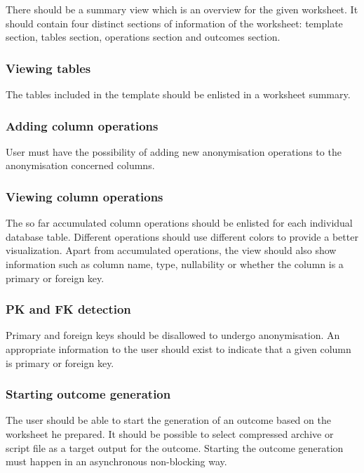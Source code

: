 \documentclass[a4paper,twoside,12pt]{book}
\begin{document}
There should be a summary view which is an overview for the given worksheet. It should contain four distinct sections of information of the worksheet: template section, tables section, operations section and outcomes section.

\subsubsection{Viewing tables}

The tables included in the template should be enlisted in a worksheet summary.

\subsubsection{Adding column operations}

User must have the possibility of adding new anonymisation operations to the anonymisation concerned columns.

\subsubsection{Viewing column operations}

The so far accumulated column operations should be enlisted for each individual database table. Different operations should use different colors to provide a better visualization. Apart from accumulated operations, the view should also show information such as column name, type, nullability or whether the column is a primary or foreign key.

\subsubsection{PK and FK detection}

Primary and foreign keys should be disallowed to undergo anonymisation. An appropriate information to the user should exist to indicate that a given column is primary or foreign key.

\subsubsection{Starting outcome generation}

The user should be able to start the generation of an outcome based on the worksheet he prepared. It should be possible to select compressed archive or script file as a target output for the outcome. Starting the outcome generation must happen in an asynchronous non-blocking way.
\end{document}
